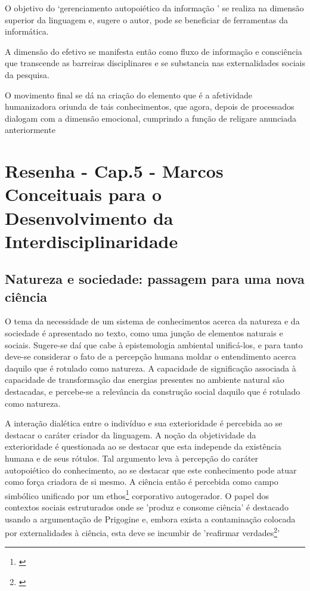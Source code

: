 \documentclass[
   article,       %
   12pt,          %
   oneside,       %
   a4paper,       %
   english,       %
   brazil,           %
   sumario=tradicional
   ]{abntex2}
\begin{document}
O objetivo do ‘gerenciamento autopoiético da informação \cite[p. 91]{Paradigma_Transdisciplinar_Metodologica}’ se realiza na dimensão superior da linguagem e, sugere o autor, pode se beneficiar de ferramentas da informática.

A dimensão do efetivo se manifesta então como fluxo de informação e consciência que transcende as barreiras disciplinares e se substancia nas externalidades sociais da pesquisa.

O movimento final se dá na criação do elemento que é a afetividade humanizadora oriunda de tais conhecimentos, que agora, depois de processados dialogam com a dimensão emocional, cumprindo a função de religare anunciada anteriormente


\newpage

\section{Resenha - Cap.5 - Marcos Conceituais para o Desenvolvimento da Interdisciplinaridade}

\subsection{Natureza e sociedade: passagem para uma nova ciência}

O tema da necessidade de um sistema de conhecimentos acerca da natureza e da sociedade é apresentado no texto, como uma junção de elementos naturais e sociais. Sugere-se daí que cabe à epistemologia ambiental unificá-los, e para tanto deve-se considerar o fato de a percepção humana moldar o entendimento acerca daquilo que é rotulado como natureza. A capacidade de significação associada à capacidade de transformação das energias presentes no ambiente natural são destacadas, e percebe-se a relevância da construção social daquilo que é rotulado como natureza.

A interação dialética entre o indivíduo e sua exterioridade é percebida ao se destacar o caráter criador da linguagem. A noção da objetividade da exterioridade é questionada ao se destacar que esta independe da existência humana e de seus rótulos. Tal argumento leva à percepção do caráter autopoiético do conhecimento, ao se destacar que este conhecimento pode atuar como força criadora de si mesmo. A ciência então é percebida como campo simbólico unificado por um ethos\footnote{\cite[p.96]{Marcos_Conceituais_Interdisciplinaridade}} corporativo autogerador. O papel dos contextos sociais estruturados onde se 'produz e consome ciência' é destacado usando a argumentação de Prigogine e, embora exista a contaminação colocada por externalidades à ciência, esta deve se incumbir de 'reafirmar verdades\footnote{\cite[p.97]{Marcos_Conceituais_Interdisciplinaridade}}'
\end{document}
